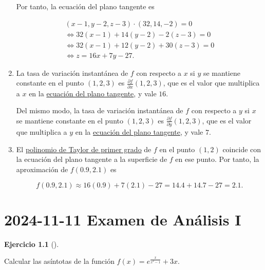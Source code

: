 \documentclass[
  spanish,
  a4paper,
]{scrreport}
\theoremstyle{definition}
\newtheorem{exercise}{Ejercicio}[chapter]
\theoremstyle{remark}
\begin{document}
\begin{tcolorbox}
\begin{enumerate}
  Por tanto, la ecuación del plano tangente es

  \[
  \begin{gathered}
  (x-1, y-2, z-3) \cdot (32, 14, -2) = 0 \\
  \Leftrightarrow 32(x-1) + 14(y-2) - 2(z-3) = 0 \\
  \Leftrightarrow 32(x-1) + 12(y-2) + 30(z-3) = 0 \\
  \Leftrightarrow z = 16x + 7y - 27.
  \end{gathered}
  \]
\item
  La tasa de variación instantánea de \(f\) con respecto a \(x\) si
  \(y\) se mantiene constante en el punto \((1,2,3)\) es
  \(\frac{\partial f}{\partial x}(1,2,3)\), que es el valor que
  multiplica a \(x\) en la
  \href{https://aprendeconalf.es/analisis-manual/13-derivadas-funciones-varias-variables.html\#def-plano-tangente-superficie}{ecuación
  del plano tangente}, y vale \(16\).

  Del mismo modo, la tasa de variación instantánea de \(f\) con respecto
  a \(y\) si \(x\) se mantiene constante en el punto \((1,2,3)\) es
  \(\frac{\partial f}{\partial y}(1,2,3)\), que es el valor que
  multiplica a \(y\) en la
  \href{https://aprendeconalf.es/analisis-manual/13-derivadas-funciones-varias-variables.html\#def-plano-tangente-superficie}{ecuación
  del plano tangente}, y vale \(7\).
\item
  El
  \href{https://aprendeconalf.es/analisis-manual/13-derivadas-funciones-varias-variables.html\#aproximaci\%C3\%B3n-lineal-de-una-funci\%C3\%B3n-de-varias-variables}{polinomio
  de Taylor de primer grado} de \(f\) en el punto \((1,2)\) coincide con
  la ecuación del plano tangente a la superficie de \(f\) en ese punto.
  Por tanto, la aproximación de \(f(0.9, 2.1)\) es

  \[
  f(0.9, 2.1) \approx 16(0.9) + 7(2.1) - 27 = 14.4 + 14.7 - 27 = 2.1.
  \]
\end{enumerate}

\end{tcolorbox}


\chapter{\texorpdfstring{2024-11-11 Examen de Análisis
I}{2024-11-11  Examen de Análisis I}}\label{examen-de-anuxe1lisis-i-4}

\begin{exercise}[]\protect\hypertarget{exr-1}{}\label{exr-1}

Calcular las asíntotas de la función \(f(x) = e^{\frac{x}{x^2-1}}+3x\).

\end{exercise}
\end{document}
